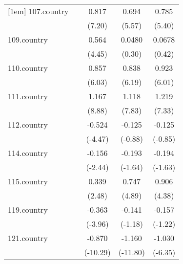 {\begin{tabular}{l*{4}{c}}
[1em]
107.country &                     &       0.817\sym{***}&       0.694\sym{***}&       0.785\sym{***}\\
            &                     &      (7.20)         &      (5.57)         &      (5.40)         \\
[1em]
109.country &                     &       0.564\sym{***}&      0.0480         &      0.0678         \\
            &                     &      (4.45)         &      (0.30)         &      (0.42)         \\
[1em]
110.country &                     &       0.857\sym{***}&       0.838\sym{***}&       0.923\sym{***}\\
            &                     &      (6.03)         &      (6.19)         &      (6.01)         \\
[1em]
111.country &                     &       1.167\sym{***}&       1.118\sym{***}&       1.219\sym{***}\\
            &                     &      (8.88)         &      (7.83)         &      (7.33)         \\
[1em]
112.country &                     &      -0.524\sym{***}&      -0.125         &      -0.125         \\
            &                     &     (-4.47)         &     (-0.88)         &     (-0.85)         \\
[1em]
114.country &                     &      -0.156\sym{*}  &      -0.193         &      -0.194         \\
            &                     &     (-2.44)         &     (-1.64)         &     (-1.63)         \\
[1em]
115.country &                     &       0.339\sym{*}  &       0.747\sym{***}&       0.906\sym{***}\\
            &                     &      (2.48)         &      (4.89)         &      (4.38)         \\
[1em]
119.country &                     &      -0.363\sym{***}&      -0.141         &      -0.157         \\
            &                     &     (-3.96)         &     (-1.18)         &     (-1.22)         \\
[1em]
121.country &                     &      -0.870\sym{***}&      -1.160\sym{***}&      -1.030\sym{***}\\
            &                     &    (-10.29)         &    (-11.80)         &     (-6.35)         \\

\end{tabular}}
